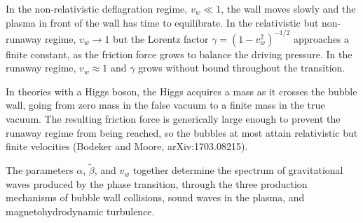In the non-relativistic deflagration regime, $v_w \ll 1$, the wall
moves slowly and the plasma in front of the wall has time to
equilibrate. In the relativistic but non-runaway regime, $v_w \to 1$
but the Lorentz factor $\gamma = (1-v_w^2)^{-1/2}$ approaches a
finite constant, as the friction force grows to balance the driving
pressure. In the runaway regime, $v_w \approx 1$ and $\gamma$
grows without bound throughout the transition.

In theories with a Higgs boson, the Higgs acquires a mass as it
crosses the bubble wall, going from zero mass in the false vacuum to
a finite mass in the true vacuum. The resulting friction force is
generically large enough to prevent the runaway regime from being
reached, so the bubbles at most attain relativistic but finite
velocities (Bodeker and Moore, arXiv:1703.08215).

The parameters $\alpha$, $\tilde\beta$, and $v_w$ together determine
the spectrum of gravitational waves produced by the phase transition,
through the three production mechanisms of bubble wall collisions,
sound waves in the plasma, and magnetohydrodynamic turbulence.
